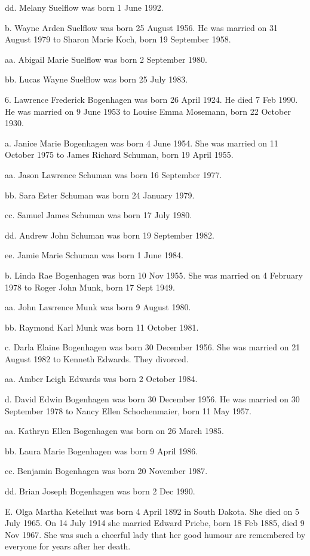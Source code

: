 \documentclass[a4paper]{article}
\begin{document}
dd. Melany Suelflow was born 1 June 1992.

b. Wayne Arden Suelflow was born 25 August 1956.  He was married on 31 August 1979 to Sharon Marie Koch, born 19 September 1958.
 
aa. Abigail Marie Suelflow was born 2 September 1980.

bb. Lucas Wayne Suelflow was born 25 July 1983.

6. Lawrence Frederick Bogenhagen was born 26 April 1924.  He died 7 Feb 1990. He was married on 9 June 1953 to Louise Emma Mosemann, born 22 October 1930.

a. Janice Marie Bogenhagen was born 4 June 1954.  She was married on 11 October 1975 to James Richard Schuman,  born 19 April 1955.

aa. Jason Lawrence Schuman was born 16 September 1977.

bb. Sara Ester Schuman was born 24 January 1979.

cc. Samuel James Schuman was born 17 July 1980.

dd. Andrew John Schuman was born 19 September 1982.

ee. Jamie Marie Schuman was born 1 June 1984. 

b. Linda Rae Bogenhagen was born 10 Nov 1955.  She was married on 4 February 1978 to Roger John Munk, born 17 Sept 1949.

aa. John Lawrence Munk was born 9 August 1980.

bb. Raymond Karl Munk was born 11 October 1981.

c. Darla Elaine Bogenhagen was born 30 December 1956.  She was married on 21 August 1982 to Kenneth Edwards.  They divorced.

aa. Amber Leigh Edwards was born 2 October 1984.

d. David Edwin Bogenhagen was born 30 December 1956.  He was married on 30 September 1978 to Nancy Ellen Schochenmaier, born 11 May 1957.

aa. Kathryn Ellen Bogenhagen was born on 26 March 1985.

bb. Laura Marie Bogenhagen was born 9 April 1986.

cc. Benjamin Bogenhagen was born 20 November 1987.

dd. Brian Joseph Bogenhagen was born 2 Dec 1990.
				
E. Olga Martha Ketelhut was born 4 April 1892 in South Dakota.  She died on 5 July 1965.   On 14 July 1914 she married Edward Priebe, born 18 Feb 1885, died 9 Nov 1967. She was such a cheerful lady that her good humour are remembered by everyone for years after her death.
\end{document}
